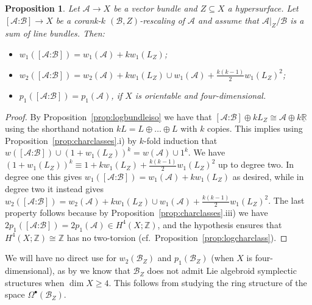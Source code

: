 \documentclass[pdftex]{sigma}
\numberwithin{equation}{section}
\newtheorem{Proposition}[Theorem]{Proposition}
 { \theoremstyle{definition}
\newtheorem{Definition}[Theorem]{Definition}
\newtheorem{Example}[Theorem]{Example}
\newtheorem{Remark}[Theorem]{Remark} }
\begin{document}
\begin{Proposition} Let $\mathcal{A} \to X$ be a vector bundle and $Z \subseteq X$ a hypersurface. Let $[\mathcal{A}\text{:}\mathcal{B}] \to X$ be a corank-$k$ $(\mathcal{B},Z)$-rescaling of $\mathcal{A}$ and assume that $\mathcal{A}|_Z/\mathcal{B}$ is a sum of line bundles. Then:
	\begin{itemize}\itemsep=0pt
	\item $w_1([\mathcal{A}\text{:}\mathcal{B}]) = w_1(\mathcal{A}) + k w_1(L_Z)$;
	\item $w_2([\mathcal{A}\text{:}\mathcal{B}]) = w_2(\mathcal{A}) + k w_1(L_Z) \cup w_1(\mathcal{A}) + \frac{k(k-1)}2 w_1(L_Z)^2$;
	\item $p_1([\mathcal{A}\text{:}\mathcal{B}]) = p_1(\mathcal{A})$, if $X$ is orientable and four-dimensional.
	\end{itemize}
\end{Proposition}
%
\begin{proof} By Proposition~\ref{prop:logbundleiso} we have that $[\mathcal{A}\text{:}\mathcal{B}] \oplus k L_Z \cong \mathcal{A} \oplus k \underline{\mathbb{R}}$ using the shorthand notation $k L = L \oplus \dots \oplus L$ with $k$ copies. This implies using Proposition~\ref{prop:charclasses}.i) by $k$-fold induction that $w([\mathcal{A}\text{:}\mathcal{B}]) \cup (1 + w_1(L_Z))^k = w(\mathcal{A}) \cup 1^k$. We have $(1 + w_1(L_Z))^k \equiv 1 + k w_1(L_Z) + \frac{k(k-1)}2 w_1(L_Z)^2$ up to degree two. In degree one this gives $w_1([\mathcal{A}\text{:}\mathcal{B}]) = w_1(\mathcal{A}) + k w_1(L_Z)$ as desired, while in degree two it instead gives $w_2([\mathcal{A}\text{:}\mathcal{B}]) = w_2(\mathcal{A}) + k w_1(L_Z) \cup w_1(\mathcal{A}) + \frac{k(k-1)}2 w_1(L_Z)^2$. The last property follows because by Proposition~\ref{prop:charclasses}.iii) we have $2p_1([\mathcal{A}\text{:}\mathcal{B}]) = 2p_1(\mathcal{A}) \in H^4(X;\mathbb{Z})$, and the hypothesis ensures that $H^4(X;\mathbb{Z}) \cong \mathbb{Z}$ has no two-torsion (cf.\ Proposition~\ref{prop:logcharclass}).
\end{proof}

\begin{Remark}\label{rem:zeronosymp} We will have no direct use for $w_2(\mathcal{B}_Z)$ and $p_1(\mathcal{B}_Z)$ (when $X$ is four-dimensional), as by \cite[Proposition 2.21]{Lanius16} we know that $\mathcal{B}_Z$ does not admit Lie algebroid symplectic structures when $\dim X \geq 4$. This follows from studying the ring structure of the space $\Omega^\bullet(\mathcal{B}_Z)$.
\end{Remark}
\end{document}
